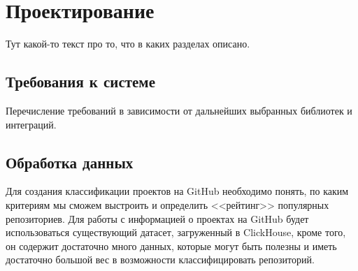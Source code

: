 \lstset{language=C, frame=L, basicstyle=\footnotesize,%
	keywordstyle=\bfseries, showstringspaces=false, xleftmargin=\parindent, numbers=none, numberstyle=\tiny, stepnumber=2, numbersep=14pt}
\newpage
\section{Проектирование}
\label{sec:Design}

Тут какой-то текст про то, что в каких разделах описано.

\subsection{Требования к системе}
\label{sec:Requirements}

Перечисление требований в зависимости от дальнейших выбранных библиотек и интеграций.

\subsection{Обработка данных}

 Для создания классификации проектов на GitHub необходимо понять, по каким критериям мы сможем выстроить и определить <<рейтинг>> популярных репозиториев. Для работы с информацией о проектах на GitHub будет использоваться существующий датасет, загруженный в ClickHouse, кроме того, он содержит достаточно много данных, которые могут быть полезны и иметь достаточно большой вес в возможности классифицировать репозиторий. 
 
